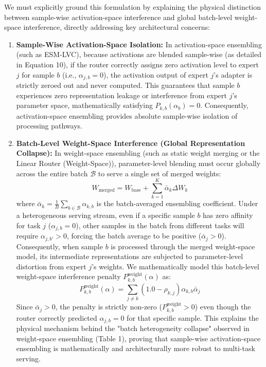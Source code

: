 We must explicitly ground this formulation by explaining the physical distinction between sample-wise activation-space interference and global batch-level weight-space interference, directly addressing key architectural concerns:
\begin{enumerate}
    \item \textbf{Sample-Wise Activation-Space Isolation:} In activation-space ensembling (such as ESM-LVC), because activations are blended sample-wise (as detailed in Equation 10), if the router correctly assigns zero activation level to expert $j$ for sample $b$ (i.e., $\alpha_{j, b} = 0$), the activation output of expert $j$'s adapter is strictly zeroed out and never computed. This guarantees that sample $b$ experiences zero representation leakage or interference from expert $j$'s parameter space, mathematically satisfying $P_{k, b}(\alpha_b) = 0$. Consequently, activation-space ensembling provides absolute sample-wise isolation of processing pathways.
    \item \textbf{Batch-Level Weight-Space Interference (Global Representation Collapse):} In weight-space ensembling (such as static weight merging or the Linear Router (Weight-Space)), parameter-level blending must occur globally across the entire batch $\mathcal{B}$ to serve a single set of merged weights:
    \begin{equation}
        W_{\text{merged}} = W_{\text{base}} + \sum_{k=1}^K \bar{\alpha}_k \Delta W_k
    \end{equation}
    where $\bar{\alpha}_k = \frac{1}{B} \sum_{b \in \mathcal{B}} \alpha_{k, b}$ is the batch-averaged ensembling coefficient. Under a heterogeneous serving stream, even if a specific sample $b$ has zero affinity for task $j$ ($\alpha_{j, b} = 0$), other samples in the batch from different tasks will require $\alpha_{j, b'} > 0$, forcing the batch average to be positive ($\bar{\alpha}_j > 0$). Consequently, when sample $b$ is processed through the merged weight-space model, its intermediate representations are subjected to parameter-level distortion from expert $j$'s weights. We mathematically model this batch-level weight-space interference penalty $P^{\text{weight}}_{k, b}(\alpha)$ as:
    \begin{equation}
        P^{\text{weight}}_{k, b}(\alpha) = \sum_{j \neq k} \left(1.0 - \rho_{k, j}\right) \alpha_{k, b} \bar{\alpha}_j
    \end{equation}
    Since $\bar{\alpha}_j > 0$, the penalty is strictly non-zero ($P^{\text{weight}}_{k, b} > 0$) even though the router correctly predicted $\alpha_{j, b} = 0$ for that specific sample. This explains the physical mechanism behind the "batch heterogeneity collapse" observed in weight-space ensembling (Table 1), proving that sample-wise activation-space ensembling is mathematically and architecturally more robust to multi-task serving.

\end{enumerate}
